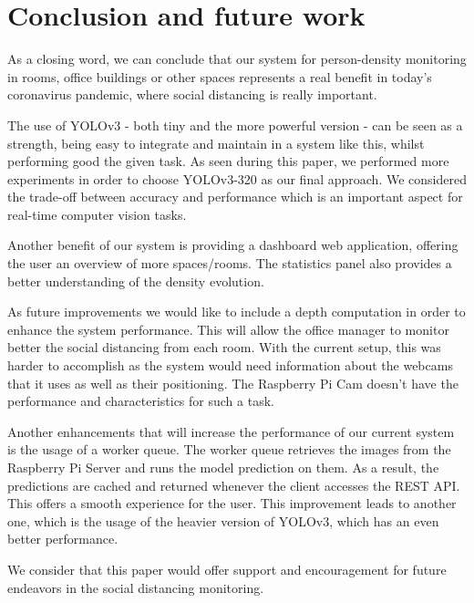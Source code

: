 \documentclass[runningheads,a4paper,11pt]{report}
\begin{document}
\chapter{Conclusion and future work}
\label{chapter:concl}

As a closing word, we can conclude that our system for person-density monitoring in rooms, office buildings or other spaces represents a real benefit in today's coronavirus pandemic, where social distancing is really important. 

The use of YOLOv3 - both tiny and the more powerful version - can be seen as a strength, being easy to integrate and maintain in a system like this, whilst performing good the given task. As seen during this paper, we performed more experiments in order to choose YOLOv3-320 as our final approach. We considered the trade-off between accuracy and performance which is an important aspect for real-time computer vision tasks. 

Another benefit of our system is providing a dashboard web application, offering the user an overview of more spaces/rooms. The statistics panel also provides a better understanding of the density evolution.

As future improvements we would like to include a depth computation in order to enhance the system performance. This will allow the office manager to monitor better the social distancing from each room. With the current setup, this was harder to accomplish as the system would need information about the webcams that it uses as well as their positioning. The Raspberry Pi Cam doesn't have the performance and characteristics for such a task.

Another enhancements that will increase the performance of our current system is the usage of a worker queue. The worker queue retrieves the images from the Raspberry Pi Server and runs the model prediction on them. As a result, the predictions are cached and returned whenever the client accesses the REST API. This offers a smooth experience for the user. This improvement leads to another one, which is the usage of the heavier version of YOLOv3, which has an even better performance. 

We consider that this paper would offer support and encouragement for future endeavors in the social distancing monitoring.
\end{document}
